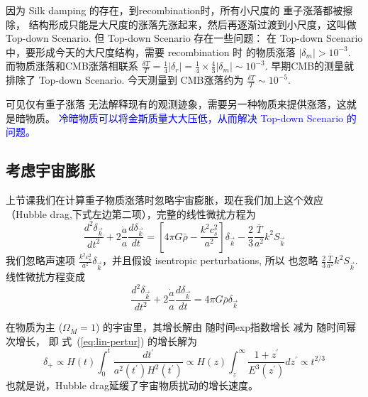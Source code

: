 \documentclass[12pt]{ctexart}
\newcommand{\new}[1]{\textcolor{blue}{#1}}
\newcommand{\refeq}[1]{式~(\ref{#1})}
\begin{document}
因为 Silk damping 的存在，到recombination时，所有小尺度的 重子涨落都被擦除，
结构形成只能是大尺度的涨落先涨起来，然后再逐渐过渡到小尺度，这叫做
Top-down Scenario.
但 Top-down Scenario
存在一些问题：
在 Top-down Scenario 中，要形成今天的大尺度结构，需要 recombination 时
的物质涨落 $|\delta_m|> 10^{-3}$. 
而物质涨落和CMB涨落相联系
$\frac{\delta T}{T}=\frac{1}{4} |\delta_r| = \frac{1}{4} \times \frac{4}{3} |\delta_m| \sim 10^{-3}$.
早期CMB的测量就排除了 Top-down Scenario. 今天测量到 CMB涨落约为 
$\frac{\delta T}{T} \sim 10^{-5}$.

可见仅有重子涨落 无法解释现有的观测迹象，需要另一种物质来提供涨落，这就是暗物质。
\new{冷暗物质可以将金斯质量大大压低，从而解决 Top-down Scenario 的问题。}

\subsection{考虑宇宙膨胀}

上节课我们在计算重子物质涨落时忽略宇宙膨胀，现在我们加上这个效应（Hubble drag,下式左边第二项），完整的线性微扰方程为
\begin{equation} \label{eq:lin-pertur_Fouri}
    \frac{d^2 \delta_{\vec{k}}}{dt^2 } + 2\frac{\dot{a}}{a} \frac{d\delta_{\vec{k}}}{dt} = \left[4\pi G \bar{\rho}-\frac{k^2c_s^2}{a^2}\right] \delta_{\vec{k}} -\frac{2}{3}\frac{\bar{T}}{a^2}k^2 S_{\vec{k}}
\end{equation}
我们忽略声速项 $\frac{k^2c_s^2}{a^2} \delta_{\vec{k}}$，并且假设 isentropic perturbations, 所以 也忽略 $\frac{2}{3}\frac{\bar{T}}{a^2}k^2 S_{\vec{k}}$. 
线性微扰方程变成
\begin{equation} \label{eq:lin-pertur}
    \frac{d^2 \delta_{\vec{k}}}{dt^2 } + 2\frac{\dot{a}}{a} \frac{d\delta_{\vec{k}}}{dt} = 4\pi G \bar{\rho} \delta_{\vec{k}} 
\end{equation}

在物质为主 ($\Omega_M=1$) 的宇宙里，其增长解由 随时间exp指数增长 减为 随时间幂次增长，
即
\refeq{eq:lin-pertur} 的增长解为
\begin{equation}
    \delta_{+} \propto H(t) \int_{0}^{t} \frac{d t^{\prime}}{a^{2}\left(t^{\prime}\right) H^{2}\left(t^{\prime}\right)} \propto H(z) \int_{z}^{\infty} \frac{1+z^{\prime}}{E^{3}\left(z^{\prime}\right)} d z^{\prime} \propto t^{2/3}
\end{equation}
也就是说，Hubble drag延缓了宇宙物质扰动的增长速度。
\end{document}
